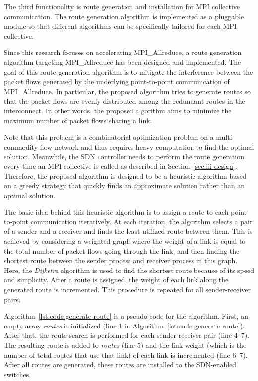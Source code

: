 The third functionality is route generation and installation for MPI
collective communication. The route generation algorithm is implemented as a
pluggable module so that different algorithms can be specifically tailored for
each MPI collective.

Since this research focuses on accelerating MPI\_Allreduce, a route generation
algorithm targeting MPI\_Allreduce has been designed and implemented. The goal
of this route generation algorithm is to mitigate the interference between the
packet flows generated by the underlying point-to-point communication of
MPI\_Allreduce. In particular, the proposed algorithm tries to generate routes
so that the packet flows are evenly distributed among the redundant routes in
the interconnect. In other words, the proposed algorithm aims to minimize the
maximum number of packet flows sharing a link.

Note that this problem is a combinatorial optimization problem on a
multi-commodity flow network and thus requires heavy computation to find the
optimal solution. Meanwhile, the SDN controller needs to perform the route
generation every time an MPI collective is called as described in
Section~\ref{sec:iii-design}. Therefore, the proposed algorithm is designed to
be a heuristic algorithm based on a greedy strategy that quickly finds an
approximate solution rather than an optimal solution.

The basic idea behind this heuristic algorithm is to assign a route to each
point-to-point communication iteratively. At each iteration, the algorithm
selects a pair of a sender and a receiver and finds the least utilized route
between them. This is achieved by considering a weighted graph where the
weight of a link is equal to the total number of packet flows going through
the link, and then finding the shortest route between the sender process and
receiver process in this graph. Here, the \emph{Dijkstra} algorithm is used to
find the shortest route because of its speed and simplicity. After a route is
assigned, the weight of each link along the generated route is incremented.
This procedure is repeated for all sender-receiver pairs.

Algorithm~\ref{lst:code-generate-route} is a pseudo-code for the algorithm.
First, an empty array \emph{routes} is initialized (line 1 in
Algorithm~\ref{lst:code-generate-route}). After that, the route search is
performed for each sender-receiver pair (line 4--7). The resulting route is
added to \emph{routes} (line 5) and the link weight (which is the number of
total routes that use that link) of each link is incremented (line 6--7).
After all routes are generated, these routes are installed to the SDN-enabled
switches.

